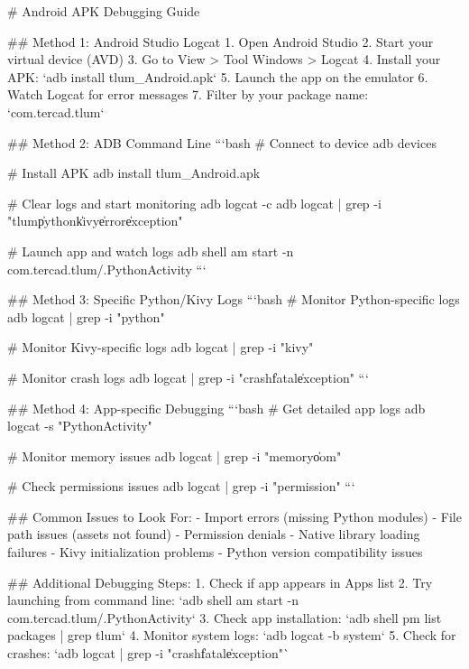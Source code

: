 
# Android APK Debugging Guide

## Method 1: Android Studio Logcat
1. Open Android Studio
2. Start your virtual device (AVD)
3. Go to View > Tool Windows > Logcat
4. Install your APK: `adb install tlum_Android.apk`
5. Launch the app on the emulator
6. Watch Logcat for error messages
7. Filter by your package name: `com.tercad.tlum`

## Method 2: ADB Command Line
```bash
# Connect to device
adb devices

# Install APK
adb install tlum_Android.apk

# Clear logs and start monitoring
adb logcat -c
adb logcat | grep -i "tlum\|python\|kivy\|error\|exception"

# Launch app and watch logs
adb shell am start -n com.tercad.tlum/.PythonActivity
```

## Method 3: Specific Python/Kivy Logs
```bash
# Monitor Python-specific logs
adb logcat | grep -i "python"

# Monitor Kivy-specific logs
adb logcat | grep -i "kivy"

# Monitor crash logs
adb logcat | grep -i "crash\|fatal\|exception"
```

## Method 4: App-specific Debugging
```bash
# Get detailed app logs
adb logcat -s "PythonActivity"

# Monitor memory issues
adb logcat | grep -i "memory\|oom"

# Check permissions issues
adb logcat | grep -i "permission"
```

## Common Issues to Look For:
- Import errors (missing Python modules)
- File path issues (assets not found)
- Permission denials
- Native library loading failures
- Kivy initialization problems
- Python version compatibility issues

## Additional Debugging Steps:
1. Check if app appears in Apps list
2. Try launching from command line: `adb shell am start -n com.tercad.tlum/.PythonActivity`
3. Check app installation: `adb shell pm list packages | grep tlum`
4. Monitor system logs: `adb logcat -b system`
5. Check for crashes: `adb logcat | grep -i "crash\|fatal\|exception"`

